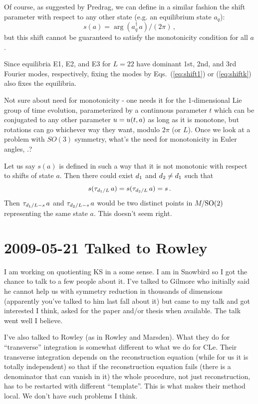 Of course, as suggested by Predrag, we can define in a similar
fashion the shift parameter with respect to any other
state (e.g. an equilibrium state $a_q$):
\[ s(a) = \arg(a_q^\dagger\, a)/(2\pi)\,, \]
but this shift cannot be guaranteed to satisfy the
monotonicity condition for all $a$.

Since equilibria E1, E2, and E3 for $L = 22$ have dominant
1st, 2nd, and 3rd Fourier modes, respectively, fixing the modes by
Eqs.~(\ref{eq:shift1}) or (\ref{eq:shiftk}) also fixes the equilibria.


\medskip{}
\medskip{}
Not sure about need for monotonicity - one needs it for the 1-dimensional
Lie group of time evolution, parameterized by a continuous parameter $t$
which can be conjugated to any other parameter $u = u(t,a)$ as long
as it is monotone, but rotations can go whichever way they want, modulo
$2\pi$ (or $L$). Once we look at a problem with $SO(3)$ symmetry, what's the
need for monotonicity in Euler angles, \etc.?

\medskip{}
Let us say $s(a)$ is defined in such a way that it is not monotonic with respect to
shifts of state $a$.  Then there could exist $d_1$ and $d_2 \neq d_1$ such that
\[ s(\tau_{d_1/L}\,a) = s(\tau_{d_2/L}\,a) = s\,. \]
Then $\tau_{d_1/L - s}\,a$ and $\tau_{d_2/L - s}\,a$ would be two distinct points
in $M$/$\textrm{SO}(2)$ representing the same state $a$.  This doesn't seem right.

\section{2009-05-21 Talked to Rowley}

I am working on quotienting KS in a some sense. I am in
Snowbird so I got the chance to talk to a few people about
it. I've talked to Gilmore who initially said he cannot help
us with symmetry reduction in thousands of dimensions
(apparently you've talked to him last fall about it) but came
to my talk and got interested I think, asked for the paper
and/or thesis when available. The talk went well I believe.

I've also talked to Rowley (as in Rowley and Marsden). What
they do for ``transverse'' integration is somewhat different to
what we do for CLe. Their transverse integration depends on
the reconstruction equation (while for us it is totally
independent) so that if the reconstruction equation fails
(there is a denominator that can vanish in it) the whole
procedure, not just reconstruction, has to be restarted with
different ``template''. This is what makes their method local.
We don't have such problems I think.

